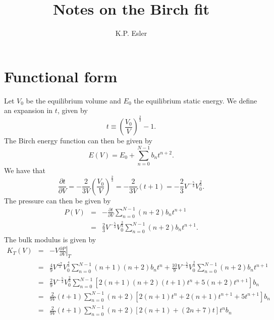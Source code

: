 \documentclass{article}
\title{Notes on the Birch fit}
\author{K.P. Esler}
\begin{document}
\maketitle
\section{Functional form}
Let $V_0$ be the equilibrium volume and $E_0$ the equilibrium static
energy.  We define an expansion in $t$, given by
\begin{equation}
t \equiv \left(\frac{V_0}{V}\right)^\frac{2}{3} - 1.
\end{equation}
The Birch energy function can then be given by
\begin{equation}
E(V) = E_0 + \sum_{n=0}^{N-1} b_n t^{n+2}.
\end{equation}
We have that
\begin{equation}
\frac{\partial t}{\partial V} = -\frac{2}{3V} 
\left(\frac{V_0}{V}\right)^{\frac{2}{3}} = -\frac{2}{3V}(t+1)
= -\frac{2}{3} V^{-\frac{5}{3}} V_0^{\frac{2}{3}}.
\end{equation}
The pressure can then be given by
\begin{eqnarray}
P(V) & = & -\frac{\partial t}{\partial V}\sum_{n=0}^{N-1} (n+2)b_n
t^{n+1} \\
& = & \frac{2}{3} V^{-\frac{5}{3}} V_0^{\frac{2}{3}} \sum_{n=0}^{N-1} (n+2)b_n
t^{n+1}.
\end{eqnarray}
The bulk modulus is given by
\begin{eqnarray}
K_T(V) & = & -V\left.\frac{\partial P}{\partial V}\right|_T \nonumber \\
& = & \frac{4}{9}V^\frac{-7}{3}V_0^{\frac{4}{3}}
\sum_{n=0}^{N-1} (n+1)(n+2)b_n t^n + \frac{10}{9}V^{-\frac{5}{3}} V_0^{\frac{2}{3}} \sum_{n=0}^{N-1} (n+2)b_n t^{n+1} \nonumber \\
& = & \frac{2}{9}V^{-\frac{5}{3}} V_0^{\frac{2}{3}}
\sum_{n=0}^{N-1} \left[2(n+1)(n+2)(t+1)t^n + 5(n+2)t^{n+1}\right]b_n \\
& = & \frac{2}{9V}(t+1) \sum_{n=0}^{N-1} (n+2)\left[2(n+1)t^n + 2(n+1)t^{n+1} + 5 t^{n+1}\right]b_n \nonumber \\
& = & \frac{2}{9V}(t+1) \sum_{n=0}^{N-1} (n+2)\left[2(n+1) + (2n+7)t\right]t^n b_n
\end{eqnarray}
\end{document}
